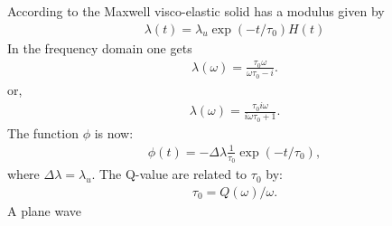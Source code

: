 \documentclass[11pt]{article}
\begin{document}
According to \cite{Casula1992} the Maxwell  visco-elastic solid
has a modulus given by
\begin{eqnarray}
\lambda(t) = \lambda_u\exp(-t/\tau_0)H(t)
\end{eqnarray}
In the frequency domain one gets
\begin{eqnarray}
\lambda(\omega) = \frac{\tau_0 \omega}{\omega\tau_0 -i}. 
\end{eqnarray}
or,
\begin{eqnarray}
\lambda(\omega) = \frac{\tau_0 i\omega}{i\omega\tau_0 +1}. 
\end{eqnarray}
The function $\phi$ is now:
\begin{eqnarray}
\phi(t) = -\Delta\lambda\frac{1}{\tau_0}\exp(-t/\tau_0),
\end{eqnarray}
where $\Delta\lambda = \lambda_u.$
The Q-value are related to $\tau_0$ by:
\begin{eqnarray}
  \tau_0 = Q(\omega)/\omega. 
\end{eqnarray}
A plane wave 

\end{document}
